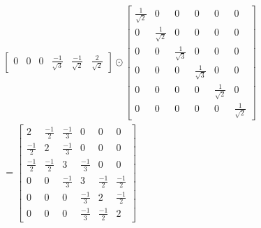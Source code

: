 \documentclass{article}
\begin{document}
\begin{multline*}
\begin{bmatrix}
      0                   & 0                   & 0                   & \frac{-1}{\sqrt{3}} & \frac{-1}{\sqrt{2}} & \frac{2}{\sqrt{2}}
    \end{bmatrix}
    \odot \begin{bmatrix}
      \frac{1}{\sqrt{2}} & 0 & 0 & 0 & 0 & 0 \\
      0 & \frac{1}{\sqrt{2}} & 0 & 0 & 0 & 0 \\
      0 & 0 & \frac{1}{\sqrt{3}} & 0 & 0 & 0 \\
      0 & 0 & 0 & \frac{1}{\sqrt{3}} & 0 & 0 \\
      0 & 0 & 0 & 0 & \frac{1}{\sqrt{2}} & 0 \\
      0 & 0 & 0 & 0 & 0 & \frac{1}{\sqrt{2}}
    \end{bmatrix} \\
    = \begin{bmatrix}
      2            & \frac{-1}{2} & \frac{-1}{3} & 0 & 0 & 0 \\
      \frac{-1}{2} & 2            & \frac{-1}{3} & 0 & 0 & 0 \\
      \frac{-1}{2} & \frac{-1}{2} & 3            & \frac{-1}{3} & 0 & 0 \\
      0            & 0            & \frac{-1}{3} & 3            & \frac{-1}{2} & \frac{-1}{2} \\
      0            & 0            & 0            & \frac{-1}{3} & 2            & \frac{-1}{2} \\
      0            & 0            & 0            & \frac{-1}{3} & \frac{-1}{2} & 2
    \end{bmatrix}
\end{multline*}

\newpage
\end{document}
